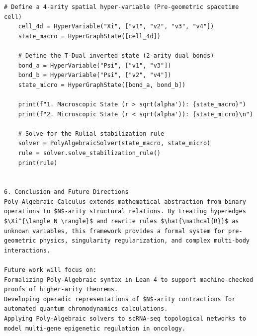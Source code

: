 \documentclass[11pt,a4paper]{article}
\begin{document}
\begin{lstlisting}[language={}, caption={}, basicstyle=\ttfamily\footnotesize, breaklines=true]
    # Define a 4-arity spatial hyper-variable (Pre-geometric spacetime cell)
    cell_4d = HyperVariable("Xi", ["v1", "v2", "v3", "v4"])
    state_macro = HyperGraphState([cell_4d])

    # Define the T-Dual inverted state (2-arity dual bonds)
    bond_a = HyperVariable("Psi", ["v1", "v3"])
    bond_b = HyperVariable("Psi", ["v2", "v4"])
    state_micro = HyperGraphState([bond_a, bond_b])

    print(f"1. Macroscopic State (r > sqrt(alpha')): {state_macro}")
    print(f"2. Microscopic State (r < sqrt(alpha')): {state_micro}\n")

    # Solve for the Rulial stabilization rule
    solver = PolyAlgebraicSolver(state_macro, state_micro)
    rule = solver.solve_stabilization_rule()
    print(rule)


6. Conclusion and Future Directions
Poly-Algebraic Calculus extends mathematical abstraction from binary operations to $N$-arity structural relations. By treating hyperedges $\Xi^{\langle N \rangle}$ and rewrite rules $\hat{\mathcal{R}}$ as unknown variables, this framework provides a formal system for pre-geometric physics, singularity regularization, and complex multi-body interactions.

Future work will focus on:
Formalizing Poly-Algebraic syntax in Lean 4 to support machine-checked proofs of higher-arity theorems.
Developing operadic representations of $N$-arity contractions for automated quantum chromodynamics calculations.
Applying Poly-Algebraic solvers to scRNA-seq topological networks to model multi-gene epigenetic regulation in oncology.

\end{lstlisting}
\end{document}

